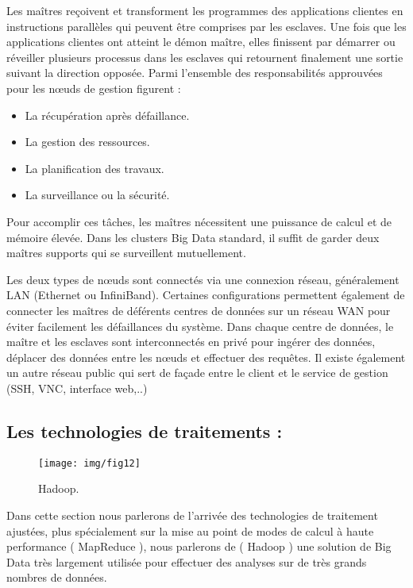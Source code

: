 Les maîtres reçoivent et transforment les programmes des applications clientes en instructions parallèles qui peuvent être comprises par les esclaves. Une fois que les applications clientes ont atteint le démon maître, elles finissent par démarrer ou réveiller plusieurs processus dans les esclaves qui retournent finalement une sortie suivant la direction opposée. Parmi l'ensemble des responsabilités approuvées pour les nœuds de gestion figurent :

\begin{itemize}[label=\textbullet]
	\item La récupération après défaillance.
	\item La gestion des ressources.
	\item La planification des travaux.
	\item La surveillance ou la sécurité.
\end{itemize}

Pour accomplir ces tâches, les maîtres nécessitent une puissance de calcul et de mémoire élevée. Dans les clusters Big Data standard, il suffit de garder deux maîtres supports qui se surveillent mutuellement.

Les deux types de nœuds sont connectés via une connexion réseau, généralement LAN (Ethernet ou InfiniBand). Certaines configurations permettent également de connecter les maîtres de déférents centres de données sur un réseau WAN pour éviter facilement les défaillances du système. Dans chaque centre de données, le maître et les esclaves sont interconnectés en privé pour ingérer des données, déplacer des données entre les nœuds et effectuer des requêtes. Il existe également un autre réseau public qui sert de façade entre le client et le service de gestion (SSH, VNC, interface web,..)

\subsection{Les technologies de traitements :}

\begin{figure}[h]
	\centering
	\texttt{[image: img/fig12]}
	\caption{Hadoop.}
\end{figure}

Dans cette section nous parlerons de l'arrivée des technologies de traitement ajustées, plus spécialement sur la mise au point de modes de calcul à haute performance ( MapReduce ), nous parlerons de ( Hadoop ) une solution de Big Data très largement utilisée pour effectuer des analyses sur de très grands nombres de données.

